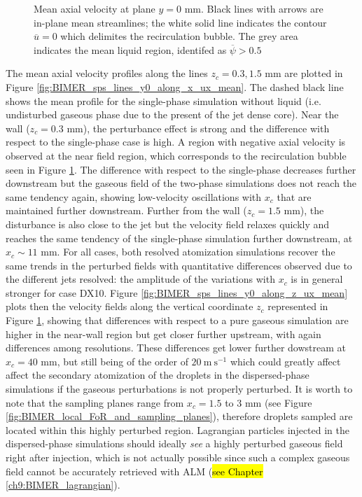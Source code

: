 \vspace*{-0.5in}


\begin{figure}[ht]
\centering
\caption[Mean axial velocity at plane $y = 0$ mm]{Mean axial velocity at plane $y = 0$ mm. Black lines with arrows are in-plane mean streamlines; the white solid line indicates the contour $\overline{u} = 0$ which delimites the recirculation bubble. The grey area indicates the mean liquid region, identifed as $\overline{\psi} > 0.5$}
\label{fig:BIMER_turbulent_structures_plane_y0}
\end{figure}


The mean axial velocity profiles along the lines $z_c = 0.3, 1.5$ mm are plotted in Figure \ref{fig:BIMER_sps_lines_y0_along_x_ux_mean}. The dashed black line shows the mean profile for the single-phase simulation without liquid (i.e. undisturbed gaseous phase due to the present of the jet dense core). Near the wall ($z_c = 0.3$ mm), the perturbance effect is strong and the difference with respect to the single-phase case is high. A region with negative axial velocity is observed at the near field region, which corresponds to the recirculation bubble seen in Figure \ref{fig:BIMER_turbulent_structures_plane_y0}. The difference with respect to the single-phase decreases further downstream but the gaseous field of the two-phase simulations does not reach the same tendency again, showing low-velocity oscillations with $x_c$ that are maintained further downstream. Further from the wall ($z_c = 1.5$ mm), the disturbance is also close to the jet but the velocity field relaxes quickly and reaches the same tendency of the single-phase simulation further downstream, at $x_c \sim 11$ mm. For all cases, both resolved atomization simulations recover the same trends in the perturbed fields with quantitative differences observed due to the different jets resolved: the amplitude of the variations with $x_c$ is in general stronger for case DX10. Figure \ref{fig:BIMER_sps_lines_y0_along_z_ux_mean} plots then the velocity fields along the vertical coordinate $z_c$ represented in Figure \ref{fig:BIMER_turbulent_structures_plane_y0}, showing that differences with respect to a pure gaseous simulation are higher in the near-wall region but get closer further upstream, with again differences among resolutions. These differences get lower further dowstream at $x_c = 40$ mm, but still being of the order of $20~\mathrm{m~s}^{-1}$ which could greatly affect affect the secondary atomization of the droplets in the dispersed-phase simulations if the gaseous perturbations is not properly perturbed. It is worth to note that the sampling planes range from $x_c = 1.5$ to $3$ mm (see Figure \ref{fig:BIMER_local_FoR_and_sampling_planes}), therefore droplets sampled are located within this highly perturbed region. Lagrangian particles injected in the dispersed-phase simulations should ideally \textsl{see} a highly perturbed gaseous field right after injection, which is not actually possible since such a complex gaseous field cannot be accurately retrieved with ALM (\hl{see Chapter} \ref{ch9:BIMER_lagrangian}).

